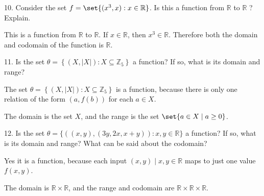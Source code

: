 \documentclass{hippoidC}
\begin{document}
\begin{prooflist}{10. Consider the set $f=\set{(x^3, x): x \in
    \mathbb{R}}$. Is this a function from $\mathbb{R}$ to $\mathbb{R}$ ?
Explain.}
\item This is a function from $\mathbb{R}$ to $\mathbb{R}$. If $x\in \mathbb{R}$, then
    $x^3 \in \mathbb{R}$. Therefore both the domain and codomain of the function
    is $\mathbb{R}$.
\end{prooflist}

\begin{prooflist}{11. Is the set $\theta=\left\{(X,|X|): X \subseteq
    \mathbb{Z}_5\right\}$ a function? If so, what is its domain and range?}
\item
    The set $\theta=\left\{(X,|X|): X \subseteq \mathbb{Z}_5\right\}$ is a
    function, because there is only one relation of the form $(a, f(b))$ for
    each $a\in X$.
\item The domain is the set $X$, and the range is the set $\set{a\in X\mid a\geq
    0}$.

\end{prooflist}

\begin{prooflist}{12. Is the set $\theta=\{((x, y),(3 y, 2 x, x+y)): x, y \in
    \mathbb{R}\}$ a function? If so, what is its domain and range? What can be
said about the codomain?}
\item Yes it is a function, because each input $(x, y)\mid x, y\in\mathbb{R}$
    maps to just one value $f(x, y)$.
\item The domain is $\mathbb{R}\times\mathbb{R}$, and the range and codomain are
    $\mathbb{R}\times\mathbb{R}\times\mathbb{R}$.
\end{prooflist}
\end{document}
